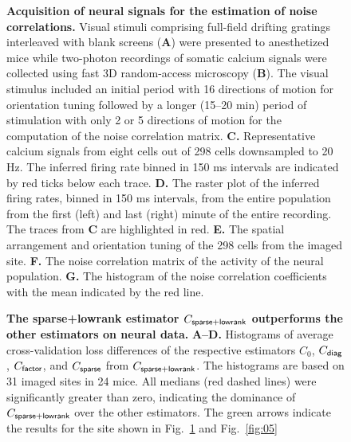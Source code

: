 \documentclass[10pt]{article}
\begin{document}
\begin{figure}[!ht]
    \begin{center}
    \end{center}
    \caption{{\bf Acquisition of neural signals for the estimation of noise correlations.}
    Visual stimuli comprising full-field drifting gratings interleaved with blank screens ({\bf A}) were presented to anesthetized mice while two-photon recordings of somatic calcium signals were collected using fast 3D random-access microscopy ({\bf B}). The visual stimulus included an initial period with 16 directions of motion for orientation tuning followed by a longer (15--20 min) period of stimulation with only 2 or 5 directions of motion for the computation of the noise correlation matrix. 
    {\bf C.} Representative calcium signals from eight cells out of 298 cells downsampled to 20 Hz. The inferred firing rate binned in 150 ms intervals are indicated by red ticks below each trace.
    {\bf D.} The raster plot of the inferred firing rates, binned in 150 ms intervals, from the entire population from the first (left) and last (right) minute of the entire recording.  The traces from {\bf C} are highlighted in red.
    {\bf E.} The spatial arrangement and orientation tuning of the 298 cells from the imaged site.
    {\bf F.} The noise correlation matrix of the activity of the neural population. 
    {\bf G.} The histogram of the noise correlation coefficients with the mean indicated by the red line.
}
    \label{fig:03}
\end{figure}

\begin{figure}[!ht]
    \begin{center}
    \end{center}
    \caption{{\bf The sparse+lowrank estimator $C_{\sf sparse+lowrank}$ outperforms the other estimators on neural data.}
    {\bf A--D.} Histograms of average cross-validation loss differences of the respective estimators $C_0$, $C_{\sf diag}$, $C_{\sf factor}$, and $C_{\sf sparse}$ from $C_{\sf sparse+lowrank}$. 
    The histograms are based on 31 imaged sites in 24 mice. 
    All medians (red dashed lines) were significantly greater than zero, indicating the dominance of $C_{\sf sparse+lowrank}$ over the other estimators. 
    The green arrows indicate the results for the site shown in Fig.~\ref{fig:03} and Fig.~\ref{fig:05}
    }
    \label{fig:04}
\end{figure}
        
\end{document}

